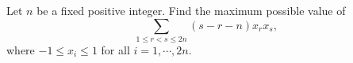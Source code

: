 Let 
$n$
 be a fixed positive integer. Find the maximum possible value of 
\[ \sum_{1 \le r < s \le 2n} (s-r-n)x_rx_s, \]
where 
$-1 \le x_i \le 1$
 for all 
$i = 1, \cdots , 2n$.
